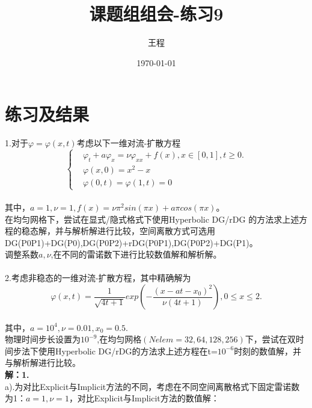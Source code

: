 \documentclass[a4paper,11pt,UTF8]{article}%
\theoremstyle{plain}
\begin{document}
	\title{\heiti 课题组组会-练习9}
	\author{王程 }
	\date{\today}
	\maketitle
	
	\section{练习及结果}
	1.对于$\varphi=\varphi\left(x,t\right)$考虑以下一维对流-扩散方程\\
	$$\left\{
	\begin{aligned}
		&\varphi_t+a\varphi_x=\nu\varphi_{xx}+f\left(x\right),x\in \left[0,1\right],t\geq 0.\\
		&\varphi\left(x,0\right)=x^2-x\\
		&\varphi\left(0,t\right)=\varphi\left(1,t\right)=0
	\end{aligned}
	\right.$$\\
	\indent 其中，$a=1,\nu=1,f\left(x\right)=\nu\pi^2sin\left(\pi x\right)+a\pi cos\left(\pi x\right)$。\\
	\indent 在均匀网格下，尝试在显式/隐式格式下使用Hyperbolic DG/rDG 的方法求上述方程的稳态解，并与解析解进行比较，空间离散方式可选用DG(P0P1)+DG(P0),DG(P0P2)+rDG(P0P1),DG(P0P2)+DG(P1)。\\
	\indent 调整系数$a,\nu$,在不同的雷诺数下进行比较数值解和解析解。\\
	~\\
	\indent 2.考虑非稳态的一维对流-扩散方程，其中精确解为
	$$\varphi\left(x,t\right)=\frac{1}{\sqrt{4t+1}}exp\left(-\frac{\left(x-at-x_0\right)^2}{\nu \left(4t+1\right)}\right),0\leq x\leq 2.$$\\
	\indent 其中，$a=10^4,\nu=0.01,x_0=0.5.$\\
	物理时间步长设置为$10^{-9}$,在均匀网格$\left(Nelem=32,64,128,256\right)$下，尝试在双时间步法下使用Hyperbolic DG/rDG的方法求上述方程在t=$10^{-6}$时刻的数值解，并与解析解进行比较。\\
	\clearpage
	\noindent \textbf{解：1.}\\
	\indent 
	a).为对比Explicit与Implicit方法的不同，考虑在不同空间离散格式下固定雷诺数为1：$a=1,\nu=1$，对比Explicit与Implicit方法的数值解：\\
\end{document}
